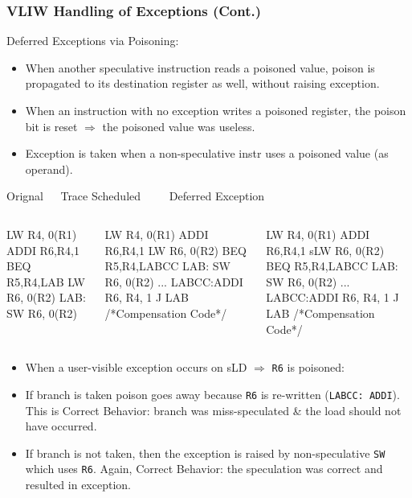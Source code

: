 \documentclass{beamer}
\renewcommand{\emph}[1]{\textcolor{structure}{#1}}
\newcommand{\emp}[1]{\textcolor{DikuRed}{ #1}}
\begin{document}
\begin{frame}[fragile,t]
    \frametitle{VLIW Handling of Exceptions (Cont.)}

Deferred Exceptions via Poisoning:
\begin{scriptsize}
\begin{itemize}
    \item When another speculative instruction reads a poisoned value, poison
            is propagated to its destination register as well, without raising 
            exception.\smallskip
    \item When an instruction with no exception writes a poisoned register,
            the poison bit is reset $\Rightarrow$ the poisoned value
            was useless.\smallskip
    \item \emp{Exception is taken when a non-speculative instr 
                uses a poisoned value (as operand)}.
\end  {itemize}
\end{scriptsize}


\smallskip

\begin{block}{Orignal{\tt~~~}Trace Scheduled{\tt~~~~~}Deferred Exception}\vspace{-1ex}
\begin{columns}
\begin{colorcode}[fontsize=\tiny]
      LW   R4, 0(R1)
      ADDI R6,R4,1
      BEQ  R5,R4,LAB
      LW   R6, 0(R2)
LAB:  SW   R6, 0(R2) 
\end{colorcode}
\begin{colorcode}[fontsize=\tiny]
      LW   R4, 0(R1)
      ADDI R6,R4,1
      \alert{LW   R6, 0(R2)}
      BEQ  R5,R4,LABCC
LAB:  SW   R6, 0(R2) 
...
LABCC:ADDI R6, R4, 1
      J    LAB
/*Compensation Code*/
\end{colorcode}
\begin{colorcode}[fontsize=\tiny]
      LW   R4, 0(R1)
      ADDI R6,R4,1
      \emp{sLW   R6, 0(R2)}
      BEQ  R5,R4,LABCC
LAB:  \emph{SW   R6, 0(R2)} 
...
\emph{LABCC:ADDI R6, R4, 1}
      J    LAB
/*Compensation Code*/
\end{colorcode}
\end{columns}
\end{block}

\begin{scriptsize}
\begin{itemize}
    \item When a user-visible exception occurs on \emp{sLD} $\Rightarrow$ {\tt R6} is poisoned:\smallskip
    \item If branch is taken poison goes away because {\tt R6} is re-written 
            ({\tt LABCC: ADDI}). \emph{This is Correct Behavior}: branch
            was miss-speculated \& the load should not have occurred. 
    \item If branch is not taken, then the exception is raised by non-speculative
            {\tt SW} which uses {\tt R6}. \emph{Again, Correct Behavior}:
            the speculation was correct and resulted in exception.
\end  {itemize}
\end{scriptsize}


\end{frame}
\end{document}
